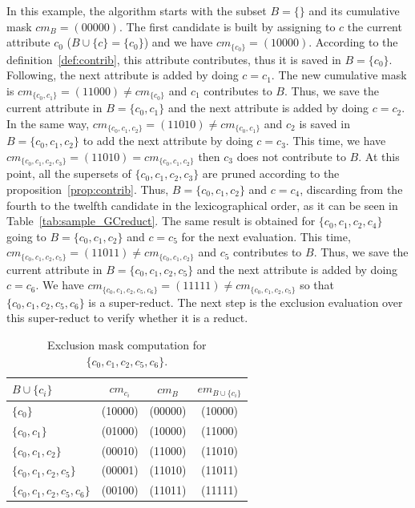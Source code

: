 \documentclass[number,preprint,review,12pt]{elsarticle}
\begin{document}
	\label{par:step}
	In this example, the algorithm starts with the subset $B=\lbrace \rbrace$ and its cumulative mask $cm_B=(00000)$. The first candidate is built by assigning to $c$ the current attribute  $c_0$ ($B\cup \lbrace c\rbrace = \lbrace c_0\rbrace$) and we have $cm_{\lbrace c_0\rbrace}=(10000)$. According to the definition~\ref{def:contrib}, this attribute contributes, thus it is saved in $B=\lbrace c_0\rbrace$. Following, the next attribute is added  by doing $c = c_1$. The new cumulative mask is $cm_{\lbrace c_0,c_1\rbrace}=(11000)\neq cm_{\lbrace c_0\rbrace}$ and $c_1$ contributes to $B$. Thus, we save the current attribute in $B = \lbrace c_0,c_1\rbrace$ and the next attribute is added by doing $c = c_2$. In the same way, $cm_{\lbrace c_0,c_1,c_2\rbrace}=(11010)\neq cm_{\lbrace c_0,c_1\rbrace}$ and $c_2$ is saved in $B = \lbrace c_0,c_1,c_2\rbrace$ to add the next attribute by doing $c = c_3$. This time, we have $cm_{\lbrace c_0,c_1,c_2,c_3\rbrace}=(11010) = cm_{\lbrace c_0,c_1,c_2\rbrace}$ then $c_3$ does not contribute to $B$. At this point, all the supersets of $\lbrace c_0,c_1,c_2,c_3\rbrace$ are pruned according to the proposition~\ref{prop:contrib}. Thus, $B = \lbrace c_0,c_1,c_2\rbrace$ and $c = c_4$, discarding from the fourth to the twelfth candidate in the lexicographical order, as it can be seen in  Table~\ref{tab:sample_GCreduct}. The same result is obtained for $\lbrace c_0,c_1,c_2,c_4\rbrace$ going to $B = \lbrace c_0,c_1,c_2\rbrace$ and $c = c_5$ for the next evaluation. This time, $cm_{\lbrace c_0,c_1,c_2,c_5\rbrace}=(11011)\neq cm_{\lbrace c_0,c_1,c_2\rbrace}$ and $c_5$ contributes to $B$. Thus, we save the current attribute in $B = \lbrace c_0,c_1,c_2,c_5\rbrace$ and the next attribute is added by doing $c = c_6$. We have $cm_{\lbrace c_0,c_1,c_2,c_5,c_6\rbrace}=(11111)\neq cm_{\lbrace c_0,c_1,c_2,c_5\rbrace}$ so that $\lbrace c_0,c_1,c_2,c_5,c_6\rbrace$ is a super-reduct. The next step is the exclusion evaluation over this super-reduct to verify whether it is a reduct.
	  
  	\begin{table}[!htb]
  		\caption{Exclusion mask computation for $\lbrace c_0,c_1,c_2,c_5,c_6\rbrace$.}\label{tab:em}
  		\centering 
  		\begin{tabular}{|l|c|c|c|}
  			\hline
  			$B\cup \lbrace c_i\rbrace$                          & $cm_{c_i}$ & $cm_B$  & $em_{B\cup \lbrace c_i\rbrace}$ \\
  			\hline
  			$\lbrace c_0\rbrace$                 & (10000)    & (00000) & (10000)          \\
  			$\lbrace c_0,c_1\rbrace$             & (01000)    & (10000) & (11000)          \\
  			$\lbrace c_0,c_1,c_2\rbrace$         & (00010)    & (11000) & (11010)          \\
  			$\lbrace c_0,c_1,c_2,c_5\rbrace$     & (00001)    & (11010) & (11011)          \\
  			$\lbrace c_0,c_1,c_2,c_5,c_6\rbrace$ & (00100)    & (11011) & (11111)          \\
  			\hline
  		\end{tabular}
  	\end{table}
	  	
\end{document}
